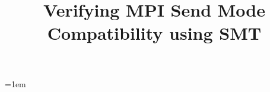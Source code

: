 \documentclass{sig-alternate-05-2015}
\begin{document}

\title{Verifying MPI Send Mode Compatibility using SMT}


\maketitle
%
%
\emergencystretch=1em


\begin{abstract} 

\end{abstract}





%

%
%
%





\newpage



\end{document}
